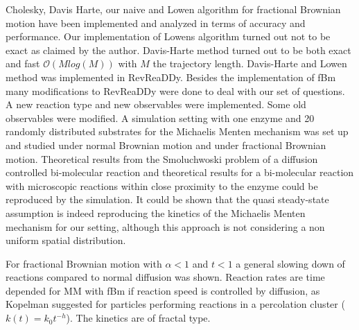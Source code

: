 \documentclass[
  a4paper,BCOR10mm,oneside,
  headsepline,footsepline,%
  fleqn,openbib
]{scrbook}
\begin{document}
Cholesky, Davis Harte, our naive and Lowen algorithm for fractional Brownian motion have been implemented and analyzed in terms of accuracy and performance. Our implementation of Lowens algorithm turned out not to be exact as claimed by the author. Davis-Harte method turned out to be both exact and fast $\mathcal{O}(M log(M))$ with $M$ the trajectory length. Davis-Harte and Lowen method was implemented in RevReaDDy. Besides the implementation of fBm many modifications to RevReaDDy were done to deal with our set of questions. A new reaction type and new observables were implemented. Some old observables were modified. A simulation setting with one enzyme and 20 randomly distributed substrates for the Michaelis Menten mechanism was set up and studied under normal Brownian motion and under fractional Brownian motion. Theoretical results from the Smoluchwoski problem of a diffusion controlled bi-molecular reaction and theoretical results for a bi-molecular reaction with microscopic reactions within close proximity to the enzyme could be reproduced by the simulation. It could be shown that the quasi steady-state assumption is indeed reproducing the kinetics of the Michaelis Menten mechanism for our setting, although this approach is not considering a non uniform spatial distribution.\par For fractional Brownian motion with $\alpha<1$ and  $t<1$ a general slowing down of reactions compared to normal diffusion was shown. Reaction rates are time depended for MM with fBm if reaction speed is controlled by diffusion, as Kopelman suggested for particles performing reactions in a percolation cluster ($k(t)=k_0 t^{-h}$). The kinetics are of fractal type.  \par
\end{document}
